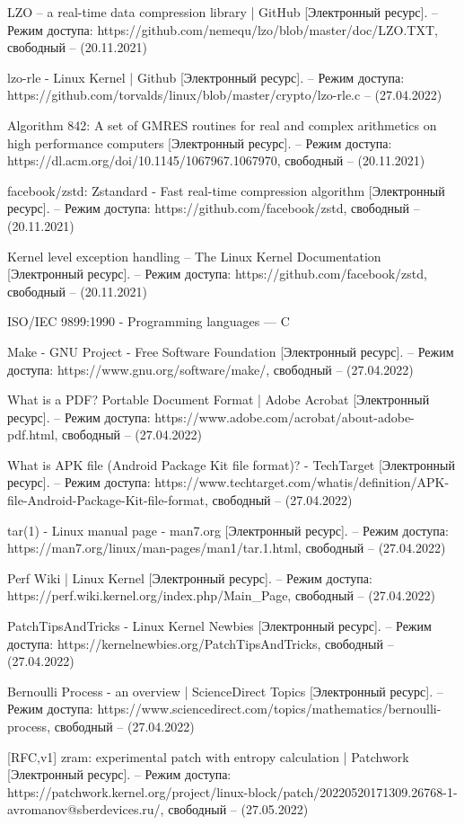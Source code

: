 \begin{thebibliography}{}
	LZO -- a real-time data compression library | GitHub [Электронный ресурс]. – Режим доступа: https://github.com/nemequ/lzo/blob/master/doc/LZO.TXT, свободный – (20.11.2021)
	
	lzo-rle - Linux Kernel | Github [Электронный ресурс]. – Режим доступа: https://github.com/torvalds/linux/blob/master/crypto/lzo-rle.c – (27.04.2022)
	
	Algorithm 842: A set of GMRES routines for real and complex arithmetics on high performance computers [Электронный ресурс]. – Режим доступа: https://dl.acm.org/doi/10.1145/1067967.1067970, свободный – (20.11.2021)
	
	facebook/zstd: Zstandard - Fast real-time compression algorithm [Электронный ресурс]. – Режим доступа: https://github.com/facebook/zstd, свободный – (20.11.2021)
	
	Kernel level exception handling -- The Linux Kernel Documentation [Электронный ресурс]. – Режим доступа: https://github.com/facebook/zstd, свободный – (20.11.2021)
	
	ISO/IEC 9899:1990 - Programming languages — C
	
	Make - GNU Project - Free Software Foundation [Электронный ресурс]. – Режим доступа: https://www.gnu.org/software/make/, свободный – (27.04.2022)
	
	What is a PDF? Portable Document Format | Adobe Acrobat [Электронный ресурс]. – Режим доступа: 	https://www.adobe.com/acrobat/about-adobe-pdf.html, свободный – (27.04.2022)
	
	What is APK file (Android Package Kit file format)? - TechTarget [Электронный ресурс]. – Режим доступа: 	https://www.techtarget.com/whatis/definition/APK-file-Android-Package-Kit-file-format, свободный – (27.04.2022)
	
	tar(1) - Linux manual page - man7.org [Электронный ресурс]. – Режим доступа: https://man7.org/linux/man-pages/man1/tar.1.html, свободный – (27.04.2022)
	
	Perf Wiki | Linux Kernel  [Электронный ресурс]. – Режим доступа: https://perf.wiki.kernel.org/index.php/Main\_Page, свободный – (27.04.2022)
	
	PatchTipsAndTricks - Linux Kernel Newbies  [Электронный ресурс]. – Режим доступа: https://kernelnewbies.org/PatchTipsAndTricks, свободный – (27.04.2022)
	
	Bernoulli Process - an overview | ScienceDirect Topics [Электронный ресурс]. – Режим доступа: https://www.sciencedirect.com/topics/mathematics/bernoulli-process, свободный – (27.04.2022)
	
	[RFC,v1] zram: experimental patch with entropy calculation | Patchwork [Электронный ресурс]. – Режим доступа: https://patchwork.kernel.org/project/linux-block/patch/20220520171309.26768-1-avromanov@sberdevices.ru/, свободный – (27.05.2022)
\end{thebibliography}
\endgroup

\pagebreak